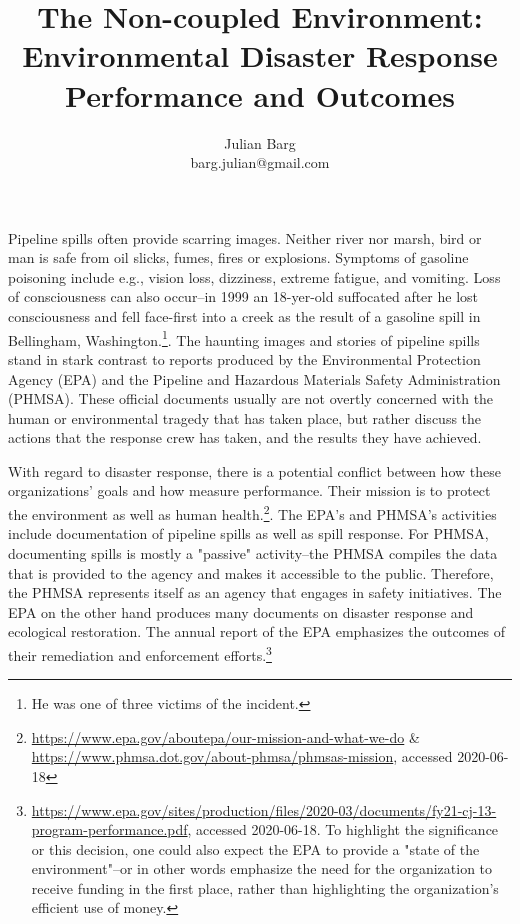 \documentclass[12pt, man, natbib]{apa6}
\title{The Non-coupled Environment: Environmental Disaster Response Performance and Outcomes}
\author{Julian Barg\\barg.julian@gmail.com}
\affiliation{Ivey Business School}
\begin{document}
	
	\maketitle
	
	\singlespacing
	
	\section{}

	Pipeline spills often provide scarring images. Neither river nor marsh, bird or man is safe from oil slicks, fumes, fires or explosions. Symptoms of gasoline poisoning include e.g., vision loss, dizziness, extreme fatigue, and vomiting. Loss of consciousness can also occur--in 1999 an 18-yer-old suffocated after he lost consciousness and fell face-first into a creek as the result of a gasoline spill in Bellingham, Washington.\footnote{He was one of three victims of the incident.}. The haunting images and stories of pipeline spills stand in stark contrast to reports produced by the Environmental Protection Agency (EPA) and the Pipeline and Hazardous Materials Safety Administration (PHMSA). These official documents usually are not overtly concerned with the human or environmental tragedy that has taken place, but rather discuss the actions that the response crew has taken, and the results they have achieved.
	
	With regard to disaster response, there is a potential conflict between how these organizations' goals and how measure performance. Their mission is to protect the environment as well as human health.\footnote{\url{https://www.epa.gov/aboutepa/our-mission-and-what-we-do} \& \url{https://www.phmsa.dot.gov/about-phmsa/phmsas-mission}, accessed 2020-06-18}. The EPA's and PHMSA's activities include documentation of pipeline spills as well as spill response. For PHMSA, documenting spills is mostly a "passive" activity--the PHMSA compiles the data that is provided to the agency and makes it accessible to the public. Therefore, the PHMSA represents itself as an agency that engages in safety initiatives. The EPA on the other hand produces many documents on disaster response and ecological restoration. The annual report of the EPA emphasizes the outcomes of their remediation and enforcement efforts.\footnote{\url{https://www.epa.gov/sites/production/files/2020-03/documents/fy21-cj-13-program-performance.pdf}, accessed 2020-06-18. To highlight the significance or this decision, one could also expect the EPA to provide a "state of the environment"--or in other words emphasize the need for the organization to receive funding in the first place, rather than highlighting the organization's efficient use of money.}
	
\end{document}
